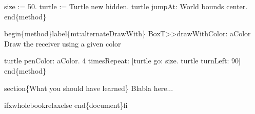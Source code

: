 \documentclass[10pt,twoside,english]{_support/latex/sbabook/sbabook}
\begin{document}
   size := 50.
   turtle := Turtle new hidden.
   turtle jumpAt: World bounds center.
end\{method\}

begin\{method\}label\{mt:alternateDrawWith\}
BoxT\textgreater{}\textgreater{}drawWithColor: aColor 
   Draw the receiver using a given color
	
   turtle penColor: aColor.
   4 timesRepeat: {[}turtle go: size.
                  turtle turnLeft: 90{]}
end\{method\}

section\{What you should have learned\}
Blabla here...

ifxwholebookrelaxelse
end\{document\}fi



\backmatter



\end{document}
